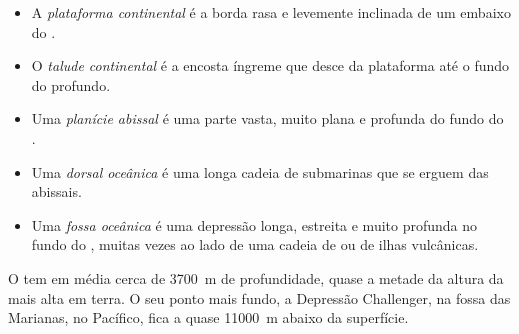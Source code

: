 \begin{definition}\label{def:g8:the-oceans:seafloor}
\begin{itemize}
  \item A \emph{plataforma continental} é a
        borda rasa e levemente inclinada de um  embaixo do .
  \item O \emph{talude continental} é a encosta
        íngreme que desce da plataforma até o fundo do  profundo.
  \item Uma \emph{planície abissal} é uma parte vasta,
        muito plana e profunda do fundo do .
  \item Uma \emph{dorsal oceânica} é uma longa cadeia de
         submarinas que se erguem das  abissais.
  \item Uma \emph{fossa oceânica} é uma depressão longa,
        estreita e muito profunda no fundo do , muitas vezes ao lado
        de uma cadeia de  ou de ilhas vulcânicas.
\end{itemize}
\end{definition}

O  tem em média cerca de \qty{3700}{m} de profundidade, quase a
metade da altura da  mais alta em terra. O seu ponto mais fundo,
a Depressão Challenger, na fossa das Marianas, no  Pacífico, fica a
quase \qty{11000}{m} abaixo da superfície.


